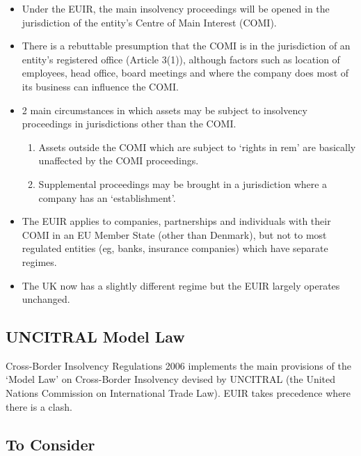 \documentclass[
]{article}
\providecommand{\tightlist}{%
  \setlength{\itemsep}{0pt}\setlength{\parskip}{0pt}}
\begin{document}
\begin{itemize}
\tightlist
\item
  Under the EUIR, the main insolvency proceedings will be opened in the
  jurisdiction of the entity's Centre of Main Interest (COMI).
\item
  There is a rebuttable presumption that the COMI is in the jurisdiction
  of an entity's registered office (Article 3(1)), although factors such
  as location of employees, head office, board meetings and where the
  company does most of its business can influence the COMI.
\item
  2 main circumstances in which assets may be subject to insolvency
  proceedings in jurisdictions other than the COMI.

  \begin{enumerate}
  \def\labelenumi{\arabic{enumi}.}
  \tightlist
  \item
    Assets outside the COMI which are subject to `rights in rem' are
    basically unaffected by the COMI proceedings.
  \item
    Supplemental proceedings may be brought in a jurisdiction where a
    company has an `establishment'.
  \end{enumerate}
\item
  The EUIR applies to companies, partnerships and individuals with their
  COMI in an EU Member State (other than Denmark), but not to most
  regulated entities (eg, banks, insurance companies) which have
  separate regimes.
\item
  The UK now has a slightly different regime but the EUIR largely
  operates unchanged.
\end{itemize}

\hypertarget{uncitral-model-law}{%
\subsection{UNCITRAL Model Law}\label{uncitral-model-law}}

Cross-Border Insolvency Regulations 2006 implements the main provisions
of the `Model Law' on Cross-Border Insolvency devised by UNCITRAL (the
United Nations Commission on International Trade Law). EUIR takes
precedence where there is a clash.

\hypertarget{to-consider}{%
\subsection{To Consider}\label{to-consider}}
\end{document}
